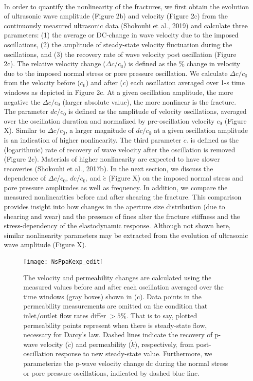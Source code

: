 \documentclass[letterpaper,10pt]{article}
\begin{document}
\paragraph{}
In order to quantify the nonlinearity of the fractures, we first obtain the evolution of ultrasonic wave amplitude (Figure 2b) and velocity (Figure 2c) from the continuously measured ultrasonic data  (Shokouhi et al., 2019) and calculate three parameters: (1) the average or DC-change in wave velocity due to the imposed oscillations, (2) the amplitude of steady-state velocity fluctuation during the oscillations, and (3) the recovery rate of wave velocity post oscillation (Figure 2c). The relative velocity change ($\Delta c/c_0$)
is defined as the \% change in velocity due to the imposed normal stress or pore pressure oscillation. We calculate $\Delta c/c_0$ 
from the velocity before ($c_0$) and after ($c$) each oscillation averaged over 1-s time windows as depicted in Figure 2c. At a given oscillation amplitude, the more negative the $\Delta c/c_0$ (larger absolute value), the more nonlinear is the fracture. The parameter 
$dc/c_0$ is defined as the amplitude of velocity oscillations, averaged over the oscillation duration and normalized by pre-oscillation velocity $c_0$ (Figure X). Similar to $\Delta c/c_0$, a larger magnitude of $dc/c_0$ at a given oscillation amplitude is an indication of higher nonlinearity. The third parameter 
$\dot c$.
is defined as the (logarithmic) rate of recovery of wave velocity after the oscillation is removed (Figure 2c). Materials of higher nonlinearity are expected to have slower recoveries (Shokouhi et al., 2017b). In the next section, we discuss the dependence of 
$\Delta c/c_0$, $dc/c_0$, and $\dot c$ 
(Figure X) on the imposed normal stress and pore pressure amplitudes as well as frequency.  In addition, we compare the measured nonlinearities before and after shearing the fracture. This comparison provides insight into how changes in the aperture size distribution (due to shearing and wear) and the presence of fines alter the fracture stiffness and the stress-dependency of the elastodynamic response. Although not shown here, similar nonlinearity parameters may be extracted from the evolution of ultrasonic wave amplitude (Figure X). 


\newpage

\begin{figure}[ht]
	\centering
	\texttt{[image: NsPpaKexp\_edit]}
	\caption[]{The velocity and permeability changes are calculated using the measured values before and after each oscillation averaged over the time windows (gray boxes) shown in (c). Data points in the permeability measurements are omitted on the condition that inlet/outlet flow rates differ $ > 5 \% $. That is to say, plotted permeability points represent when there is steady-state flow, necessary for Darcy’s law. Dashed lines indicate the recovery of p-wave velocity ($ \dot c$) and permeability ($\dot k$), respectively, from post-oscillation response to new steady-state value. Furthermore, we parameterize the p-wave velocity change dc during the normal stress or pore pressure oscillations, indicated by dashed blue line.}
	\label{fig:delc_delk_calc}
\end{figure}
\end{document}
